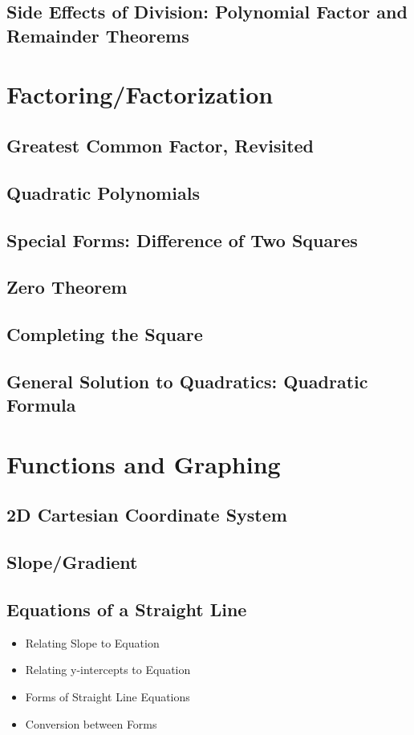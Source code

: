 \documentclass[11pt]{article}
\begin{document}
\subsection{Side Effects of Division: Polynomial Factor and Remainder Theorems}

\setcounter{section}{3}
\section{Factoring/Factorization}
\subsection{Greatest Common Factor, Revisited}
\subsection{Quadratic Polynomials}
\subsection{Special Forms: Difference of Two Squares}
\subsection{Zero Theorem}
\subsection{Completing the Square}
\subsection{General Solution to Quadratics: Quadratic Formula}

\setcounter{section}{4}
\section{Functions and Graphing}
\subsection{2D Cartesian Coordinate System}
\subsection{Slope/Gradient}
\subsection{Equations of a Straight Line}
\begin{itemize}
    \item Relating Slope to Equation
    \item Relating y-intercepts to Equation
    \item Forms of Straight Line Equations
    \item Conversion between Forms
\end{itemize}
\end{document}
